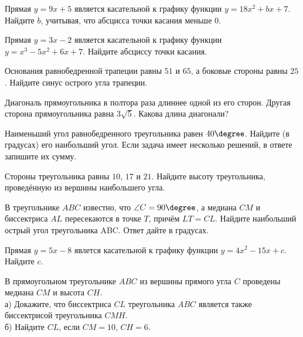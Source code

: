 \begin{homework}[number=2]
	\begin{listofex}
		\item Прямая \( y=9x+5 \) является касательной к графику функции \( y=18x^2+bx+7 \). Найдите \( b \), учитывая, что абсцисса точки касания меньше \( 0 \).
		\item Прямая \( y=3x-2 \) является касательной к графику функции \( y=x^3-5x^2+6x+7 \). Найдите абсциссу точки касания.
		\item Основания равнобедренной трапеции равны \( 51 \) и \( 65 \), а боковые стороны равны \( 25 \). Найдите синус острого угла трапеции.
		\item Диагональ прямоугольника в полтора раза длиннее одной из его сторон. Другая сторона прямоугольника равна \( 3\sqrt{5} \). Какова длина диагонали?
		\item Наименьший угол равнобедренного треугольника равен \( 40\degree \). Найдите (в градусах) его наибольший угол. Если задача
		имеет несколько решений, в ответе запишите их сумму.
		\item Стороны треугольника равны \( 10 \), \( 17 \) и \( 21 \). Найдите высоту треугольника, проведённую из вершины наибольшего угла.
		\item В треугольнике \( ABC \) известно, что \( \angle C = 90\degree \),
		а медиана \( CM \) и биссектриса \( AL \) пересекаются в точке \( T \), причём \( LT = CL \).
		Найдите наибольший острый угол треугольника ABC.
		Ответ дайте в градусах.
		\item Прямая \( y=5x-8 \) явлется касательной к графику функции \( y=4x^2-15x+c \). Найдите \( c \).
		\item В прямоугольном треугольнике \( ABC \) из вершины прямого
		угла \( C \) проведены медиана \( CM \) и высота \( CH \).\\
		а) Докажите, что биссектриса \( CL \) треугольника \( ABC \) является
		также биссектрисой треугольника \( CMH \).\\
		б) Найдите \( CL \), если \( CM = 10 \), \( CH = 6 \).
		\item {}
		\item {}
	\end{listofex}
\end{homework}
%
% 
